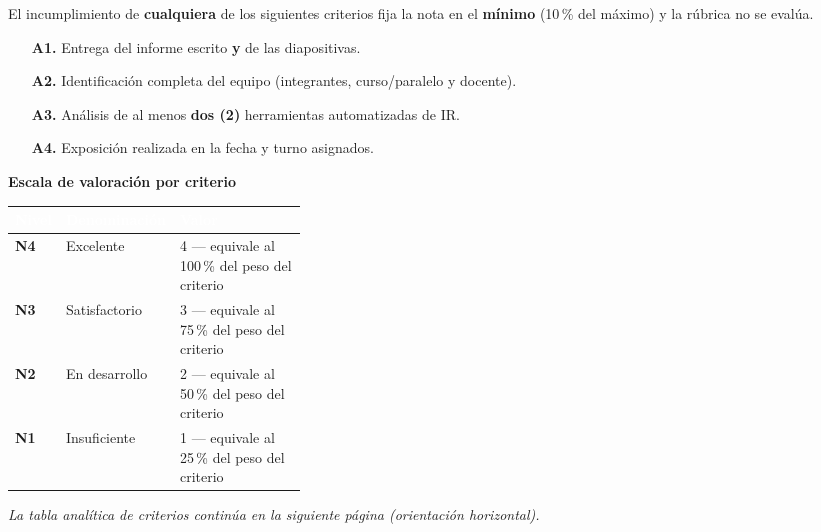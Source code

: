 \documentclass[10pt]{article}
\begin{document}
\begin{tcolorbox}[colback=white,colframe=rojoadm,sharp corners,boxrule=1pt,
  left=8pt,right=8pt,top=6pt,bottom=6pt,
  title={\textbf{CRITERIOS DE ADMISI\'ON (\textit{gatekeeper})}},
  coltitle=white,colbacktitle=rojoadm,fonttitle=\bfseries]
  El incumplimiento de \textbf{cualquiera} de los siguientes criterios fija la nota en el
  \textbf{m\'inimo} (10\,\% del m\'aximo) y la r\'ubrica no se eval\'ua.
  \begin{itemize}[leftmargin=1.4em,itemsep=1pt,topsep=3pt]
    \item[\textbf{A1.}] Entrega del informe escrito \textbf{y} de las diapositivas.
    \item[\textbf{A2.}] Identificaci\'on completa del equipo (integrantes, curso/paralelo y docente).
    \item[\textbf{A3.}] An\'alisis de al menos \textbf{dos (2)} herramientas automatizadas de IR.
    \item[\textbf{A4.}] Exposici\'on realizada en la fecha y turno asignados.
  \end{itemize}
\end{tcolorbox}

\vspace{6pt}

\noindent\textbf{\textcolor{uteqazul}{Escala de valoraci\'on por criterio}}\\[3pt]
\noindent\begin{tabularx}{\linewidth}{|C{0.10\linewidth}|L{0.24\linewidth}|X|}
\hline
{}\textcolor{white}{\textbf{Nivel}} & \textcolor{white}{\textbf{Denominaci\'on}} & \textcolor{white}{\textbf{Valor}} \\
\hline
{}\textbf{N4} & Excelente & 4 — equivale al 100\,\% del peso del criterio \\
\hline
{}\textbf{N3} & Satisfactorio & 3 — equivale al 75\,\% del peso del criterio \\
\hline
{}\textbf{N2} & En desarrollo & 2 — equivale al 50\,\% del peso del criterio \\
\hline
{}\textbf{N1} & Insuficiente & 1 — equivale al 25\,\% del peso del criterio \\
\hline
\end{tabularx}

\vspace{10pt}
\begin{center}
\textit{\small La tabla anal\'itica de criterios contin\'ua en la siguiente p\'agina (orientaci\'on horizontal).}
\end{center}
\end{document}
